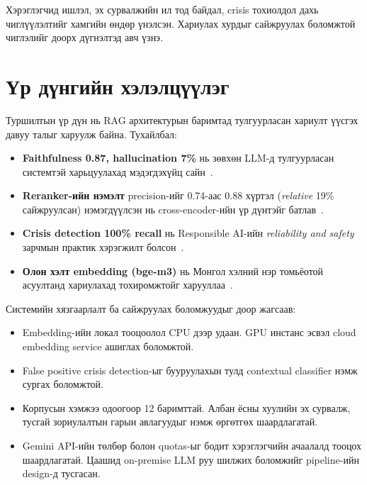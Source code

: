 Хэрэглэгчид ишлэл, эх сурвалжийн ил тод байдал, crisis тохиолдол дахь чиглүүлэлтийг хамгийн өндөр үнэлсэн. Хариулах хурдыг сайжруулах боломжтой чиглэлийг доорх дүгнэлтэд авч үзнэ.


\section{Үр дүнгийн хэлэлцүүлэг}

Туршилтын үр дүн нь RAG архитектурын баримтад тулгуурласан хариулт үүсгэх давуу талыг харуулж байна. Тухайлбал:

\begin{itemize}
    \item \textbf{Faithfulness 0.87, hallucination 7\%} нь зөвхөн LLM-д тулгуурласан системтэй харьцуулахад мэдэгдэхүйц сайн~\cite{rag_survey,hallucination_survey}.
    \item \textbf{Reranker-ийн нэмэлт} precision-ийг 0.74-аас 0.88 хүртэл (\textit{relative} 19\% сайжруулсан) нэмэгдүүлсэн нь cross-encoder-ийн үр дүнтэйг батлав~\cite{bge_reranker}.
    \item \textbf{Crisis detection 100\% recall} нь Responsible AI-ийн \textit{reliability and safety} зарчмын практик хэрэгжилт болсон~\cite{responsible_ai}.
    \item \textbf{Олон хэлт embedding (bge-m3)} нь Монгол хэлний нэр томьёотой асуултанд хариулахад тохиромжтойг харууллаа~\cite{bge_m3}.
\end{itemize}

\noindent Системийн хязгаарлалт ба сайжруулах боломжуудыг доор жагсаав:
\begin{itemize}
    \item Embedding-ийн локал тооцоолол CPU дээр удаан. GPU инстанс эсвэл cloud embedding service ашиглах боломжтой.
    \item False positive crisis detection-ыг бууруулахын тулд contextual classifier нэмж сургах боломжтой.
    \item Корпусын хэмжээ одоогоор 12 баримттай. Албан ёсны хуулийн эх сурвалж, тусгай зориулалтын гарын авлагуудыг нэмж өргөтгөх шаардлагатай.
    \item Gemini API-ийн төлбөр болон quotas-ыг бодит хэрэглэгчийн ачаалалд тооцох шаардлагатай. Цаашид on-premise LLM руу шилжих боломжийг pipeline-ийн design-д тусгасан.
\end{itemize}

